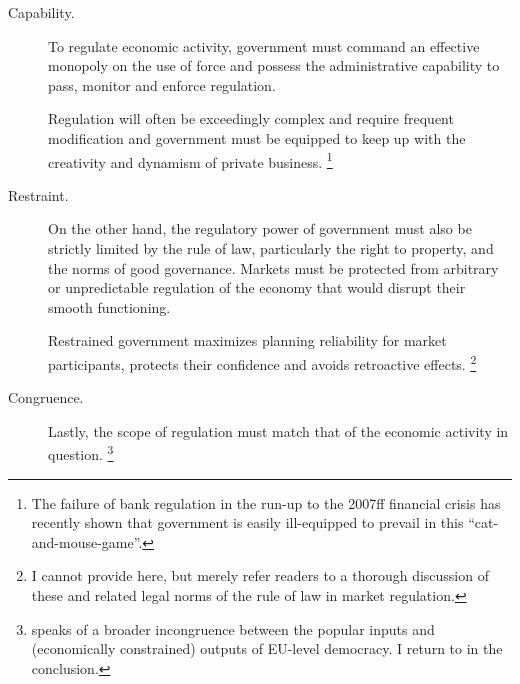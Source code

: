 \begin{description}
	\item[Capability.]
	\label{itm:capability}
	To regulate economic activity, government must command an effective monopoly on the use of force and possess the administrative capability to pass, monitor and enforce regulation.

	Regulation will often be exceedingly complex and require frequent modification and government must be equipped to keep up with the creativity and dynamism of private business.
	\footnote{
		The failure of bank regulation in the run-up to the 2007ff financial crisis has recently shown that government is easily ill-equipped to prevail in this ``cat-and-mouse-game''.
	}

	\item[Restraint.]
	\label{itm:restraint}
	On the other hand, the regulatory power of government must also be strictly limited by the rule of law, particularly the right to property, and the norms of good governance.
	Markets must be protected from arbitrary or unpredictable regulation of the economy that would disrupt their smooth functioning.

	Restrained government maximizes planning reliability for market participants, protects their confidence and avoids retroactive effects.
	\footnote{
		I cannot provide here, but merely refer readers to a thorough discussion of these and related legal norms of the rule of law in market regulation.
	}

	\item[Congruence.]
	\label{itm:congruence}
	Lastly, the scope of regulation must match that of the economic activity in question.
	\footnote{
		\cite{Zurn-2000-aa} speaks of a broader incongruence between the popular inputs and (economically constrained) outputs of EU-level democracy.
		I return to in the conclusion.
	}


\end{description}
